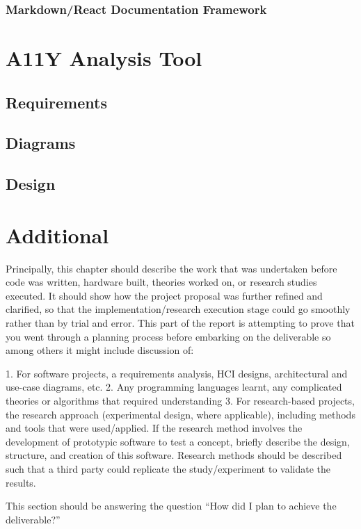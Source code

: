 \subsubsection{Markdown/React Documentation Framework}

\section{A11Y Analysis Tool}
\subsection{Requirements}
\subsection{Diagrams}
\subsection{Design}

\section{Additional }


Principally, this chapter should describe the work that was undertaken before
code was written, hardware built, theories worked on, or research studies
executed. It should show how the project proposal was further refined and
clarified, so that the implementation/research execution stage could go
smoothly rather than by trial and error. This part of the report is attempting to
prove that you went through a planning process before embarking on the
deliverable so among others it might include discussion of:

1. For software projects, a requirements analysis, HCI designs, architectural
and use-case diagrams, etc.
2. Any programming languages learnt, any complicated theories or algorithms
that required understanding
3. For research-based projects, the research approach (experimental design,
where applicable), including methods and tools that were used/applied. If the
research method involves the development of prototypic software to test a
concept, briefly describe the design, structure, and creation of this software.
Research methods should be described such that a third party could replicate
the study/experiment to validate the results.

This section should be answering the question “How did I plan to achieve the
deliverable?”
